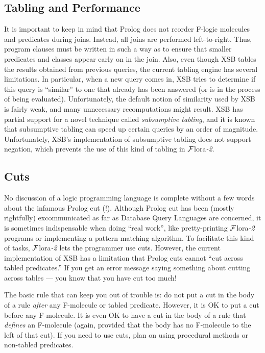 \documentclass[11pt]{article}
\newcommand{\FLORA}{{\mbox{\sc ${\cal F}${lora}\rm\emph{-2}}}\xspace}
\newcommand{\fl}{\mbox{F-logic}\xspace}
\begin{document}
\subsection{Tabling and Performance}

It is important to keep in mind that Prolog does not reorder \fl molecules
and predicates during joins. Instead, all joins are performed
left-to-right.  Thus, program clauses must be written in such a way as to
ensure that smaller predicates and classes appear early on in the join.
Also, even though XSB tables the results obtained from previous queries,
the current tabling engine has several limitations. In particular, when a
new query comes in, XSB tries to determine if this query is ``similar'' to
one that already has been answered (or is in the process of being
evaluated).  Unfortunately, the default notion of similarity used by XSB is
fairly weak, and many unnecessary recomputations might result. XSB has
partial support for a
novel technique called \emph{subsumptive tabling}, and
it is known that subsumptive tabling can speed up
certain queries by an order of magnitude. Unfortunately, XSB's implementation
of subsumptive tabling does not support negation, which prevents
the use of this kind of tabling in \FLORA.


\subsection{Cuts}


\index{cut!in \FLORA}
No discussion of a logic programming language is complete without a few
words about the infamous Prolog cut (!). Although Prolog cut has been
(mostly rightfully) excommunicated as far as Database Query Languages are
concerned, it is sometimes indispensable when doing ``real work'', like
pretty-printing \FLORA programs or implementing a pattern matching
algorithm.  To facilitate this kind of tasks, \FLORA lets the programmer
use cuts.  However, the current implementation of XSB has a limitation that
Prolog cuts cannot ``cut across tabled predicates.''  If you get an error
message saying something about cutting across tables --- you know that
you have cut too much!

The basic rule that can keep you out of trouble is: do not put a cut in the
body of a rule \emph{after} any F-molecule or tabled 
predicate. However, it is OK to put a cut before any F-molecule. It is
even OK to have a cut in the body of a rule that \emph{defines} an
F-molecule (again, provided that the body has no F-molecule to the left of
that cut). If you need to use cuts, plan on using procedural methods or
non-tabled predicates.
\end{document}
